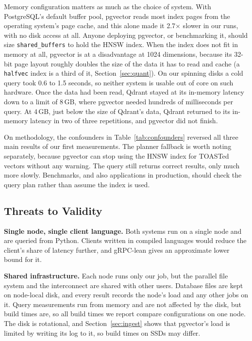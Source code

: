 \documentclass[sigconf, nonacm]{acmart}
\begin{document}
Memory configuration matters as much as the choice of system. With PostgreSQL's
default buffer pool, pgvector reads most index pages from the operating system's page
cache, and this alone made it 2.7$\times$ slower in our runs, with no disk access at all.
Anyone deploying pgvector, or benchmarking it, should size \texttt{shared\_buffers} to
hold the HNSW index. When the index does not fit in memory at all, pgvector is at a
disadvantage at 1024 dimensions, because its 32-bit page layout roughly doubles the size of the
data it has to read and cache (a \texttt{halfvec} index is a third of it, Section~\ref{sec:quant}). On our spinning disks a cold query took 0.6 to 1.5
seconds, so neither system is usable out of core on such hardware. Once the data had been
read, Qdrant stayed at its in-memory latency down to a limit of 8\,GB, where pgvector needed
hundreds of milliseconds per query. At 4\,GB, just below the size of Qdrant's data, Qdrant
returned to its in-memory latency in two of three repetitions, and pgvector did not finish.

On methodology, the confounders in Table~\ref{tab:confounders} reversed all three main
results of our first measurements. The planner fallback is worth noting separately,
because pgvector can stop using the HNSW index for TOASTed vectors without any warning.
The query still returns correct results, only much more slowly. Benchmarks, and also
applications in production, should check the query plan rather than assume the index is
used.

\subsection{Threats to Validity}
\label{sec:threats}

\textbf{Single node, single client language.} Both systems run on a single node and are
queried from Python. Clients written in compiled languages would reduce the client's
share of latency further, and gRPC-lean gives an approximate lower bound for it.

\textbf{Shared infrastructure.} Each node runs only our job, but the parallel file
system and the interconnect are shared with other users. Database files are kept on
node-local disk, and every result records the node's load and any other jobs on it.
Query measurements run from memory and are not affected by the disk, but build times
are, so all build times we report compare configurations on one node. The disk is
rotational, and Section~\ref{sec:ingest} shows that pgvector's load is limited by writing
its log to it, so build times on SSDs may differ.
\end{document}
